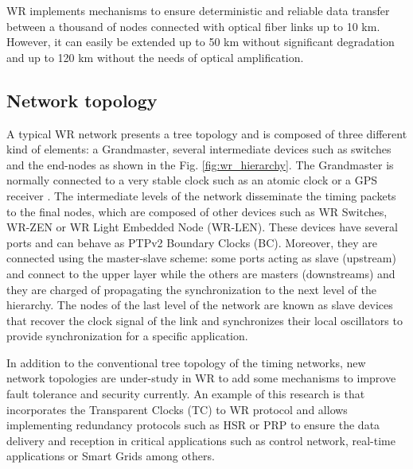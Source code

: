 WR implements mechanisms to ensure deterministic and reliable data transfer 
between a thousand of nodes connected with  optical fiber links up to 10 km. 
However, it can easily be extended up to 50 km without significant degradation 
and up to 120 km without the needs of optical amplification. 

\subsection{Network topology} 
\label{subsec:wr-net}

A typical WR network presents a tree topology and is composed of three different kind of elements: a Grandmaster, several intermediate devices such as switches and the end-nodes as shown in the Fig. \ref{fig:wr_hierarchy}. The Grandmaster is normally connected to a very stable clock such as an atomic clock or a GPS receiver \cite{Daniluk2012}. The intermediate levels of the network disseminate the timing packets to the final nodes, which are composed of other devices such as WR Switches, WR-ZEN or WR Light Embedded Node (WR-LEN). These devices have several ports and can behave as PTPv2 Boundary Clocks (BC). Moreover, they are connected using the master-slave scheme: some ports acting as slave (upstream) and connect to the upper layer while the others are masters (downstreams) and they are charged of propagating the synchronization to the next level of the hierarchy. The nodes of the last level of the network are known as slave devices that recover the clock signal of the link and synchronizes their local oscillators to provide synchronization for a specific application.

In addition to the conventional tree topology of the timing networks, new network topologies are under-study in WR to add some mechanisms to improve fault tolerance and security currently. An example of this research is \cite{jlgutierrez-paper-redundancy} that incorporates the Transparent Clocks (TC) to WR protocol and allows implementing redundancy protocols such as HSR or PRP to ensure the data delivery and reception in critical applications such as control network, real-time applications or Smart Grids among others.

